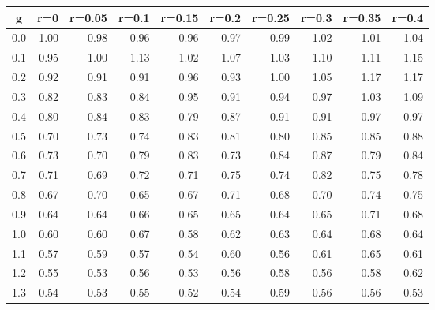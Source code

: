 %
\begin{table}[!tbp]
 \begin{center}
 \begin{tabular}{rrrrrrrrrr}\hline\hline
\multicolumn{1}{c}{g}&\multicolumn{1}{c}{r=0}&\multicolumn{1}{c}{r=0.05}&\multicolumn{1}{c}{r=0.1}&\multicolumn{1}{c}{r=0.15}&\multicolumn{1}{c}{r=0.2}&\multicolumn{1}{c}{r=0.25}&\multicolumn{1}{c}{r=0.3}&\multicolumn{1}{c}{r=0.35}&\multicolumn{1}{c}{r=0.4}\tabularnewline
\hline
0.0&1.00&0.98&0.96&0.96&0.97&0.99&1.02&1.01&1.04\tabularnewline
0.1&0.95&1.00&1.13&1.02&1.07&1.03&1.10&1.11&1.15\tabularnewline
0.2&0.92&0.91&0.91&0.96&0.93&1.00&1.05&1.17&1.17\tabularnewline
0.3&0.82&0.83&0.84&0.95&0.91&0.94&0.97&1.03&1.09\tabularnewline
0.4&0.80&0.84&0.83&0.79&0.87&0.91&0.91&0.97&0.97\tabularnewline
0.5&0.70&0.73&0.74&0.83&0.81&0.80&0.85&0.85&0.88\tabularnewline
0.6&0.73&0.70&0.79&0.83&0.73&0.84&0.87&0.79&0.84\tabularnewline
0.7&0.71&0.69&0.72&0.71&0.75&0.74&0.82&0.75&0.78\tabularnewline
0.8&0.67&0.70&0.65&0.67&0.71&0.68&0.70&0.74&0.75\tabularnewline
0.9&0.64&0.64&0.66&0.65&0.65&0.64&0.65&0.71&0.68\tabularnewline
1.0&0.60&0.60&0.67&0.58&0.62&0.63&0.64&0.68&0.64\tabularnewline
1.1&0.57&0.59&0.57&0.54&0.60&0.56&0.61&0.65&0.61\tabularnewline
1.2&0.55&0.53&0.56&0.53&0.56&0.58&0.56&0.58&0.62\tabularnewline
1.3&0.54&0.53&0.55&0.52&0.54&0.59&0.56&0.56&0.53\tabularnewline
\hline
\end{tabular}

\end{center}

\end{table}


